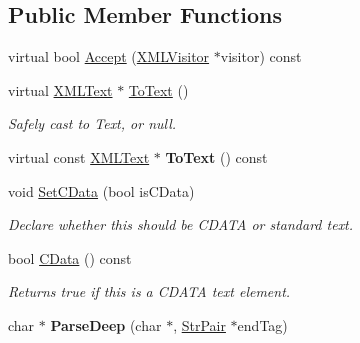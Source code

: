 \subsection*{Public Member Functions}
\begin{DoxyCompactItemize}
\item 
virtual bool \hyperlink{classtinyxml2_1_1_x_m_l_text_a5182333a5bad80566a0c6e475e828d1d}{Accept} (\hyperlink{classtinyxml2_1_1_x_m_l_visitor}{X\+M\+L\+Visitor} $\ast$visitor) const 
\item 
virtual \hyperlink{classtinyxml2_1_1_x_m_l_text}{X\+M\+L\+Text} $\ast$ \hyperlink{classtinyxml2_1_1_x_m_l_text_ab1213b4ddebe9b17ec7e7040e9f1caf7}{To\+Text} ()\hypertarget{classtinyxml2_1_1_x_m_l_text_ab1213b4ddebe9b17ec7e7040e9f1caf7}{}\label{classtinyxml2_1_1_x_m_l_text_ab1213b4ddebe9b17ec7e7040e9f1caf7}

\begin{DoxyCompactList}\small\item\em Safely cast to Text, or null. \end{DoxyCompactList}\item 
virtual const \hyperlink{classtinyxml2_1_1_x_m_l_text}{X\+M\+L\+Text} $\ast$ {\bfseries To\+Text} () const \hypertarget{classtinyxml2_1_1_x_m_l_text_a1e53cbc60968fe966790a65eaf87baaa}{}\label{classtinyxml2_1_1_x_m_l_text_a1e53cbc60968fe966790a65eaf87baaa}

\item 
void \hyperlink{classtinyxml2_1_1_x_m_l_text_ad080357d76ab7cc59d7651249949329d}{Set\+C\+Data} (bool is\+C\+Data)\hypertarget{classtinyxml2_1_1_x_m_l_text_ad080357d76ab7cc59d7651249949329d}{}\label{classtinyxml2_1_1_x_m_l_text_ad080357d76ab7cc59d7651249949329d}

\begin{DoxyCompactList}\small\item\em Declare whether this should be C\+D\+A\+TA or standard text. \end{DoxyCompactList}\item 
bool \hyperlink{classtinyxml2_1_1_x_m_l_text_a125574fe49da80efbae1349f20d02d41}{C\+Data} () const \hypertarget{classtinyxml2_1_1_x_m_l_text_a125574fe49da80efbae1349f20d02d41}{}\label{classtinyxml2_1_1_x_m_l_text_a125574fe49da80efbae1349f20d02d41}

\begin{DoxyCompactList}\small\item\em Returns true if this is a C\+D\+A\+TA text element. \end{DoxyCompactList}\item 
char $\ast$ {\bfseries Parse\+Deep} (char $\ast$, \hyperlink{classtinyxml2_1_1_str_pair}{Str\+Pair} $\ast$end\+Tag)\hypertarget{classtinyxml2_1_1_x_m_l_text_a29f626cc5bf9d536e21fe033ecd5994a}{}\label{classtinyxml2_1_1_x_m_l_text_a29f626cc5bf9d536e21fe033ecd5994a}


\end{DoxyCompactItemize}
